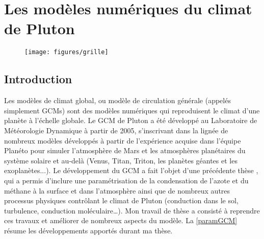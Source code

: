 
\chapter{Les modèles numériques du climat de Pluton}
\label{chap:modele}

\begin{figure}[h!]
\begin{center}
\texttt{[image: figures/grille]}
\caption*{}
\end{center}
\end{figure}
	
\minitoc

\newpage

\section{Introduction}

Les modèles de climat global, ou modèle de circulation générale (appelés simplement GCMs) sont des modèles numériques qui reproduisent le climat d’une planète à l’échelle globale. 
Le GCM de Pluton a été développé au Laboratoire de Météorologie Dynamique à partir de 2005, s’inscrivant dans la lignée de nombreux modèles développés à partir de l’expérience acquise dans l’équipe Planéto pour simuler l’atmosphère de Mars \citep{Forg:99} et les atmosphères planétaires du système solaire et au-delà (Venus, Titan, Triton, les planètes géantes et les exoplanètes...).
Le développement du GCM a fait l’objet d’une précédente thèse \citep{Vang:13}, qui a permis d’inclure une paramétrisation de la condensation de l’azote et du méthane à la surface et dans l’atmosphère ainsi que de nombreux autres processus physiques contrôlant le climat de Pluton (conduction dans le sol, turbulence, conduction moléculaire…).
Mon travail de thèse a consisté à reprendre ces travaux et améliorer de nombreux aspects du modèle. La \autoref{paramGCM} résume les développements apportés durant ma thèse. 

